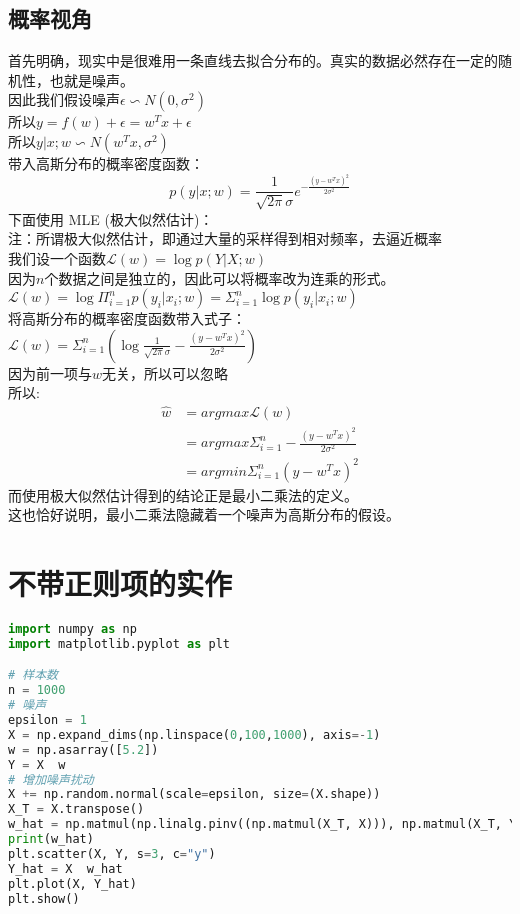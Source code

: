 \documentclass{report}
\begin{document}
\subsection{概率视角}
首先明确，现实中是很难用一条直线去拟合分布的。真实的数据必然存在一定的随机性，也就是噪声。\\
因此我们假设噪声$\epsilon\backsim N(0,\sigma^2)$\\
所以$y=f(w)+\epsilon=w^Tx+\epsilon$\\
所以$y|x;w\backsim N(w^Tx,\sigma^2)$\\
带入高斯分布的概率密度函数：
$$
p(y|x;w)=\frac{1}{\sqrt{2\pi}\sigma}e^{-\frac{(y-w^Tx)^2}{2\sigma^2}}
$$
下面使用 MLE (极大似然估计)：\\
注：所谓极大似然估计，即通过大量的采样得到相对频率，去逼近概率\\
我们设一个函数$\mathcal{L}(w)=\log{p(Y|X;w)}$\\
因为$n$个数据之间是独立的，因此可以将概率改为连乘的形式。\\
$\mathcal{L}(w)=\log{\Pi_{i=1}^np(y_i|x_i;w)}=\Sigma_{i=1}^n \log{p(y_i|x_i;w)}$\\
将高斯分布的概率密度函数带入式子：\\
$\mathcal{L}(w)=\Sigma_{i=1}^n(\log{\frac{1}{\sqrt{2\pi}\sigma}}-\frac{(y-w^Tx)^2}{2\sigma^2})$\\
因为前一项与$w$无关，所以可以忽略\\
所以:
$$
\begin{aligned}
\hat{w}
&=argmax \mathcal{L}(w)\\
&=argmax \Sigma_{i=1}^n -\frac{(y-w^Tx)^2}{2\sigma^2}\\
&=argmin \Sigma_{i=1}^n (y-w^Tx)^2
\end{aligned}
$$
而使用极大似然估计得到的结论正是最小二乘法的定义。\\
这也恰好说明，最小二乘法隐藏着一个噪声为高斯分布的假设。
\section{不带正则项的实作}
\begin{lstlisting}[language={python}]
%matplotlib inline
import numpy as np
import matplotlib.pyplot as plt

# 样本数
n = 1000
# 噪声
epsilon = 1
X = np.expand_dims(np.linspace(0,100,1000), axis=-1)
w = np.asarray([5.2])
Y = X  w
# 增加噪声扰动
X += np.random.normal(scale=epsilon, size=(X.shape))
X_T = X.transpose()
w_hat = np.matmul(np.linalg.pinv((np.matmul(X_T, X))), np.matmul(X_T, Y))
print(w_hat)
plt.scatter(X, Y, s=3, c="y")
Y_hat = X  w_hat
plt.plot(X, Y_hat)
plt.show()
\end{lstlisting}
\end{document}
